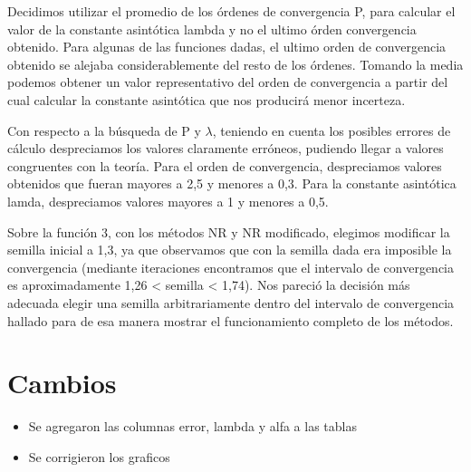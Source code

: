 \documentclass[titlepage,a4paper]{article}
\begin{document}
Decidimos utilizar el promedio de los órdenes de convergencia P, para calcular el valor de la constante asintótica lambda y no el ultimo órden convergencia obtenido. Para algunas de las funciones dadas, el ultimo orden de convergencia obtenido se alejaba considerablemente del resto de los órdenes. Tomando la media podemos obtener un valor representativo del orden de convergencia a partir del cual calcular la constante asintótica que nos producirá menor incerteza.
 
Con respecto a la búsqueda de P y $\lambda$, teniendo en cuenta los posibles errores de cálculo despreciamos los valores claramente erróneos, pudiendo llegar a valores congruentes con la teoría. Para el orden de convergencia, despreciamos valores obtenidos que fueran mayores a 2,5 y menores a 0,3. Para la constante asintótica lamda, despreciamos valores mayores a 1 y menores a 0,5. 

Sobre la función 3, con los métodos NR y NR modificado, elegimos modificar la semilla inicial a 1,3, ya que observamos que con la semilla dada era imposible la convergencia (mediante iteraciones encontramos que el intervalo de convergencia es aproximadamente 1,26 < semilla < 1,74). Nos pareció la decisión más adecuada elegir una semilla arbitrariamente dentro del intervalo de convergencia hallado para de esa manera mostrar el funcionamiento completo de los métodos.

\section{Cambios}\label{sec:cambios}
    \begin{itemize}
        \item Se agregaron las columnas error, lambda y alfa a las tablas
        \item Se corrigieron los graficos
    \end{itemize}
\end{document}
